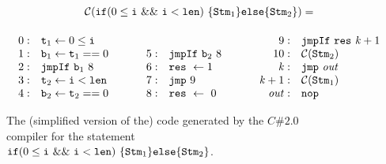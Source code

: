 \documentclass{llncs}
\begin{document}
\begin{figure}[t]
\[
\begin{array}{ccc}
\multicolumn{3}{c}{
 \Comp(\If (0 \leq \code{i}\ \&\&\ \code{i} < \code{len})\ \{ \Stm_1
 \} \Else \{ \Stm_2 \}) = }
\\[5mm]
  \begin{array}[b]{r l}
    0: & \code{t}_1 \takes 0 \leq \code{i} \\
    1: & \code{b}_1 \takes \code{t}_1 == 0 \\
    2: & \JumpIf\ \code{b}_1\ 8 \\
    3: & \code{t}_2 \takes \code{i} < \code{len} \\
    4: & \code{b}_2 \takes \code{t}_2 == 0 \\
  \end{array}
&
  \hspace{5mm}
  \begin{array}[b]{r l}
    5: & \JumpIf\ \code{b}_2\ 8 \\
    6: & \result\ \takes 1 \\
    7: & \Jump\ 9 \\
    8: & \result\ \takes\ 0 \\
  \end{array} 
&
  \hspace{5mm}
  \begin{array}[b]{r l}
    9: & \JumpIf\ \result\ \mathit{k}+1 \\
    10: & \Comp(\Stm_2) \\
    \mathit{k} : & \Jump\ \mathit{out} \\
    \mathit{k}+1 : & \Comp(\Stm_1) \\
    \mathit{out} : &\Nop
  \end{array}
\end{array}
\]
\caption{The (simplified version of the) code generated by the $C\# 2.0$ compiler for the statement  $\mathtt{if} (0 \leq \mathtt{i}\ \&\&\ \mathtt{i} < \mathtt{len})\ \{ \mathtt{Stm}_1 \} \mathtt{else} \{ \mathtt{Stm}_2 \}$.}
\label{comp:shortcut}
\end{figure}
\end{document}

